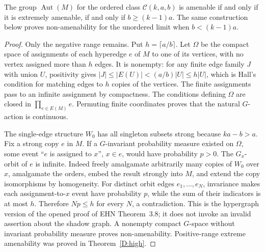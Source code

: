 \begin{theorem}
\label{D:amenability}
The group $\operatorname{Aut}(M)$ for the ordered class
$\mathcal C(k,a,b)$ is amenable if and only if it is extremely
amenable, if and only if $b\geq(k-1)a$. The same construction below
proves non-amenability for the unordered limit when $b<(k-1)a$.
\end{theorem}
\begin{proof}
Only the negative range remains. Put $h=\lceil a/b\rceil$.
Let $\Omega$ be the compact space of assignments of each hyperedge
$e$ of $M$ to one of its vertices, with no vertex assigned more
than $h$ edges. It is nonempty: for any finite edge family $J$
with union $U$, positivity gives
$|J|\leq|E(U)|<(a/b)|U|\leq h|U|$, which is Hall's condition
for matching edges to $h$ copies of the vertices. The finite
assignments pass to an infinite assignment by compactness.
The conditions defining $\Omega$ are closed in
$\prod_{e\in E(M)}e$. Permuting finite coordinates proves that the
natural $G$-action is continuous.

The single-edge structure $W_0$ has all singleton subsets strong
because $ka-b>a$. Fix a strong copy $e$ in $M$. If a
$G$-invariant probability measure existed on $\Omega$, some event
``$e$ is assigned to $x$'', $x\in e$, would have probability
$p>0$. The $G_x$-orbit of $e$ is infinite. Indeed freely amalgamate
arbitrarily many copies of $W_0$ over $x$, amalgamate the orders,
embed the result strongly into $M$, and extend the copy
isomorphisms by homogeneity. For distinct orbit edges
$e_1,\ldots,e_N$, invariance makes each assignment-to-$x$ event
have probability $p$, while the sum of their indicators is at most
$h$. Therefore $Np\leq h$ for every $N$, a contradiction.
This is the hypergraph version of the opened proof of EHN
Theorem~3.8; it does not invoke an invalid assertion about the shadow
graph. A nonempty compact $G$-space without invariant probability
measure proves non-amenability. Positive-range extreme amenability
was proved in Theorem~\ref{D:high}.
\end{proof}

